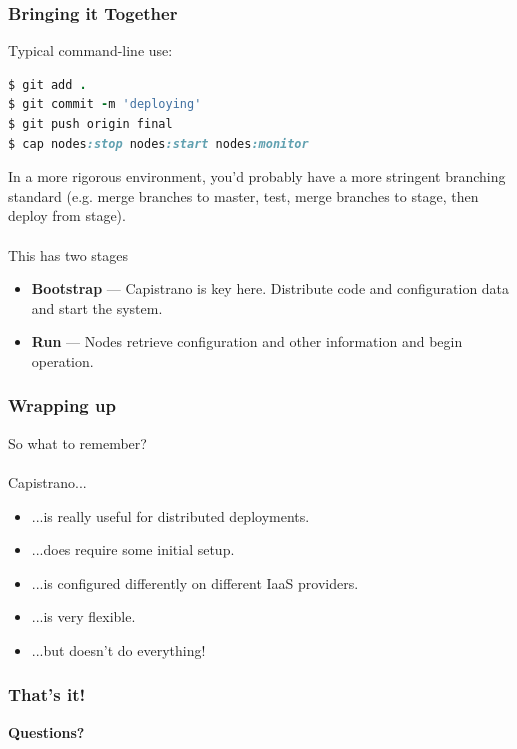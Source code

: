 \documentclass[t,handout]{beamer}
\begin{document}
\begin{frame}[fragile]
\frametitle{Bringing it Together}
Typical command-line use:
\begin{lstlisting}[frame=none,
  language=Ruby,
  basicstyle=\scriptsize\ttfamily\color{black},
  commentstyle=\scriptsize\ttfamily\color{red},
  stringstyle=\scriptsize\ttfamily\color{black}]
$ git add .
$ git commit -m 'deploying'
$ git push origin final
$ cap nodes:stop nodes:start nodes:monitor  
\end{lstlisting}
In a more rigorous environment, you'd probably have a more stringent branching standard (e.g. merge branches to master, test, merge branches to stage, then deploy from stage).
\\~\\
This has two stages
\begin{small}
\begin{itemize}
\item {\bf Bootstrap} --- Capistrano is key here.  Distribute code and configuration data and start the system.
\item {\bf Run} --- Nodes retrieve configuration and other information and begin operation.
\end{itemize}
\end{small}
\end{frame}

\begin{frame}
\frametitle{Wrapping up}
So what to remember? \\~\\

Capistrano...
\begin{itemize}
\item ...is really useful for distributed deployments.
\item ...does require some initial setup.
\item ...is configured differently on different IaaS providers.
\item ...is very flexible.
\item ...but doesn't do everything!
\end{itemize}
\end{frame}

\begin{frame}[c]
\frametitle{That's it!}
\begin{center}
{\bf Questions?}
\end{center}
\end{frame}
\end{document}
